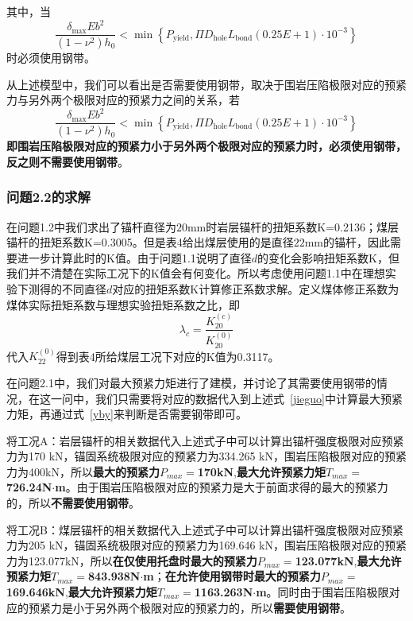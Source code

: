 \documentclass[UTF-8,a4paper,zihao=-4]{ctexart}
\begin{document}
其中，当
\begin{equation}
    \frac{\delta_{\max}Eb^2}{(1-\nu^2)h_0}<\min
    \left\{
    P_{\mathrm{yield}},
    \Pi D_{\mathrm{hole}}
    L_{\mathrm{bond}}
    (0.25E+1) \cdot 10^{-3}
    \right\}
    \label{yby}
\end{equation}
时必须使用钢带。
    
从上述模型中，我们可以看出是否需要使用钢带，取决于围岩压陷极限对应的预紧力与另外两个极限对应的预紧力之间的关系，若
\[\frac{\delta_{\max}Eb^2}{(1-\nu^2)h_0}<\min
    \left\{
    P_{\mathrm{yield}},
    \Pi D_{\mathrm{hole}}
    L_{\mathrm{bond}}
    (0.25E+1) \cdot 10^{-3}
    \right\}\]
\textbf{即围岩压陷极限对应的预紧力小于另外两个极限对应的预紧力时，必须使用钢带，反之则不需要使用钢带}。

\subsubsection{问题2.2的求解}
在问题1.2中我们求出了锚杆直径为$20$mm时岩层锚杆的扭矩系数K=0.2136；煤层锚杆的扭矩系数K=0.3005。但是表4给出煤层使用的是直径$22$mm的锚杆，因此需要进一步计算此时的K值。由于问题1.1说明了直径$d$的变化会影响扭矩系数K，但我们并不清楚在实际工况下的K值会有何变化。所以考虑使用问题1.1中在理想实验下测得的不同直径$d$对应的扭矩系数K计算修正系数求解。定义煤体修正系数为煤体实际扭矩系数与理想实验扭矩系数之比，即
\begin{equation}
\lambda_c=\frac{K_{20}^{(c)}}{K_{20}^{(0)}}
\end{equation}
代入$K_{22}^{(0)}$得到表4所给煤层工况下对应的K值为0.3117。

在问题2.1中，我们对最大预紧力矩进行了建模，并讨论了其需要使用钢带的情况，在这一问中，我们只需要将对应的数据代入到上述式~\ref{jieguo}中计算最大预紧力矩，再通过式~\ref{yby}来判断是否需要钢带即可。

将工况A：岩层锚杆的相关数据代入上述式子中可以计算出锚杆强度极限对应预紧力为170 kN，锚固系统极限对应的预紧力为334.265 kN，围岩压陷极限对应的预紧力为400kN，所以\textbf{最大的预紧力$P_{max}=$170kN},\textbf{最大允许预紧力矩$T_{max}=$726.24{N$\cdot$m}}。由于围岩压陷极限对应的预紧力是大于前面求得的最大的预紧力的，所以\textbf{不需要使用钢带}。

将工况B：煤层锚杆的相关数据代入上述式子中可以计算出锚杆强度极限对应预紧力为205 kN，锚固系统极限对应的预紧力为169.646 kN，围岩压陷极限对应的预紧力为123.077kN，所以\textbf{在仅使用托盘时最大的预紧力$P_{max}=$123.077kN},\textbf{最大允许预紧力矩$T_{max}=$843.938N$\cdot$m}；\textbf{在允许使用钢带时最大的预紧力$P_{max}=$169.646kN},\textbf{最大允许预紧力矩$T_{max}=$1163.263N$\cdot$m}。同时由于围岩压陷极限对应的预紧力是小于另外两个极限对应的预紧力的，所以\textbf{需要使用钢带}。
\end{document}
